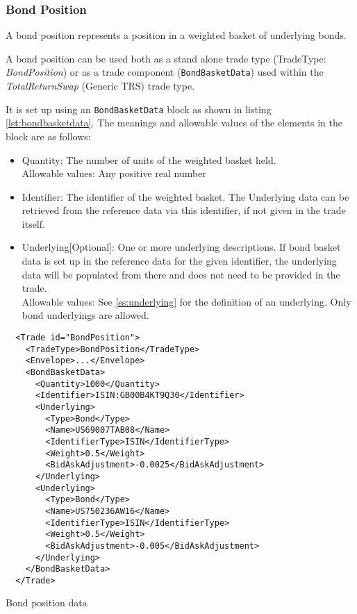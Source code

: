 \subsubsection{Bond Position}
\label{ss:bond_position}

A bond position represents a position in a weighted basket of underlying bonds.

A bond position can be used both as a stand alone trade type (TradeType: \emph{BondPosition}) or as a trade component ({\tt BondBasketData}) used within the \emph{TotalReturnSwap} (Generic TRS) trade type.

It is set up using an {\tt BondBasketData} block as shown in listing \ref{lst:bondbasketdata}. The meanings and allowable
values of the elements in the block are as follows:

\begin{itemize}
\item Quantity: The number of units of the weighted basket held.\\
  Allowable values: Any positive real number
\item Identifier: The identifier of the weighted basket. The Underlying data can be retrieved from the reference data
  via this identifier, if not given in the trade itself.\\
\item Underlying[Optional]: One or more underlying descriptions. If bond basket data is set up in the reference data for the given identifier, the underlying data will be populated from there and does not need to be provided in the trade. \\
  Allowable values: See \ref{ss:underlying} for the definition of an underlying. Only bond underlyings are allowed.
\end{itemize}

\begin{listing}[H]
\begin{verbatim}
  <Trade id="BondPosition">
    <TradeType>BondPosition</TradeType>
    <Envelope>...</Envelope>
    <BondBasketData>
      <Quantity>1000</Quantity>
      <Identifier>ISIN:GB00B4KT9Q30</Identifier>
      <Underlying>
        <Type>Bond</Type>
        <Name>US69007TAB08</Name>
        <IdentifierType>ISIN</IdentifierType>
        <Weight>0.5</Weight>
        <BidAskAdjustment>-0.0025</BidAskAdjustment>
      </Underlying>
      <Underlying>
        <Type>Bond</Type>
        <Name>US750236AW16</Name>
        <IdentifierType>ISIN</IdentifierType>
        <Weight>0.5</Weight>
        <BidAskAdjustment>-0.005</BidAskAdjustment>
      </Underlying>
    </BondBasketData>
  </Trade>
\end{verbatim}
\caption{Bond position data}
\label{lst:bondbasketdata}
\end{listing}
